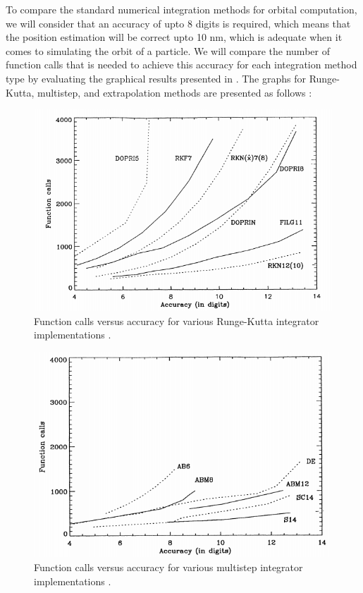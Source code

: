 To compare the standard numerical integration methods for orbital computation, we will consider that an accuracy of upto 8 digits is required, which means that the position estimation will be correct upto 10 nm, which is adequate when it comes to simulating the orbit of a particle. We will compare the number of function calls that is needed to achieve this accuracy for each integration method type by evaluating the graphical results presented in \cite{integ_comp}. The graphs for Runge-Kutta, multistep, and extrapolation methods are presented as follows \cite{integ_comp}:
%
\begin{figure}[h]
\centering
\captionsetup{justification=centering}
\includegraphics[scale=0.7]{rkc.png}
\caption{Function calls versus accuracy for various Runge-Kutta integrator implementations \cite{integ_comp}.}
\label{fig:rkc}
\end{figure}
\FloatBarrier
%
%
\begin{figure}[h]
\centering
\captionsetup{justification=centering}
\includegraphics[scale=0.7]{multic.png}
\caption{Function calls versus accuracy for various multistep integrator implementations \cite{integ_comp}.}
\label{fig:mc}
\end{figure}
